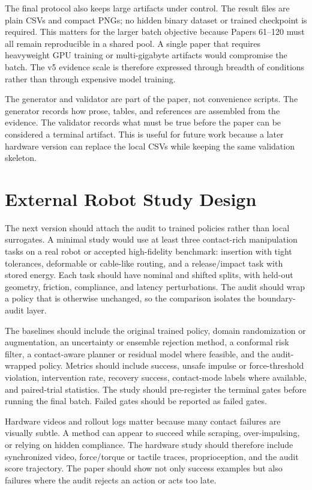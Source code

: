 \documentclass{article}
\begin{document}
The final protocol also keeps large artifacts under control. The result files are plain CSVs and compact PNGs; no hidden binary dataset or trained checkpoint is required. This matters for the larger batch objective because Papers 61--120 must all remain reproducible in a shared pool. A single paper that requires heavyweight GPU training or multi-gigabyte artifacts would compromise the batch. The v5 evidence scale is therefore expressed through breadth of conditions rather than through expensive model training.

The generator and validator are part of the paper, not convenience scripts. The generator records how prose, tables, and references are assembled from the evidence. The validator records what must be true before the paper can be considered a terminal artifact. This is useful for future work because a later hardware version can replace the local CSVs while keeping the same validation skeleton.

\clearpage
\section{External Robot Study Design}
The next version should attach the audit to trained policies rather than local surrogates. A minimal study would use at least three contact-rich manipulation tasks on a real robot or accepted high-fidelity benchmark: insertion with tight tolerances, deformable or cable-like routing, and a release/impact task with stored energy. Each task should have nominal and shifted splits, with held-out geometry, friction, compliance, and latency perturbations. The audit should wrap a policy that is otherwise unchanged, so the comparison isolates the boundary-audit layer.

The baselines should include the original trained policy, domain randomization or augmentation, an uncertainty or ensemble rejection method, a conformal risk filter, a contact-aware planner or residual model where feasible, and the audit-wrapped policy. Metrics should include success, unsafe impulse or force-threshold violation, intervention rate, recovery success, contact-mode labels where available, and paired-trial statistics. The study should pre-register the terminal gates before running the final batch. Failed gates should be reported as failed gates.

Hardware videos and rollout logs matter because many contact failures are visually subtle. A method can appear to succeed while scraping, over-impulsing, or relying on hidden compliance. The hardware study should therefore include synchronized video, force/torque or tactile traces, proprioception, and the audit score trajectory. The paper should show not only success examples but also failures where the audit rejects an action or acts too late.
\end{document}
